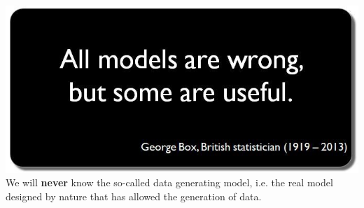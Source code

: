 \documentclass[12pt]{beamer}
\begin{document}
\begin{frame}
\begin{figure}
	
\end{figure}
\includegraphics[width=.8\linewidth]{box}
We will \textbf{never} know the so-called data generating model, i.e. the real model designed by nature that has allowed the generation of data.

\end{frame}





\end{document}
